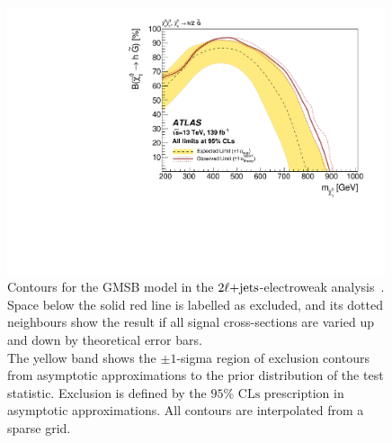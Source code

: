 \begin{figure}[tp]
\centering
\includegraphics[width=0.99\textwidth]{figures/2ljets_contours_gmsb.pdf}
\caption{%
Contours for the GMSB model in the $2\ell\mathrm{+jets}$-electroweak
analysis~\cite{atlas2022searches}.
\\[0.5em]
Space below the solid red line is labelled as excluded, and its dotted
neighbours show the result if all signal cross-sections are varied up and down
by theoretical error bars.
\\[0.5em]
The yellow band shows the $\pm1$-sigma region of exclusion contours
from asymptotic approximations to the prior distribution of the test statistic.
Exclusion is defined by the $95\%$ $\mathrm{CLs}$ prescription
in asymptotic approximations.
All contours are interpolated from a sparse grid.
}
\label{fig:2ljets_contours_gmsb}
\end{figure}


